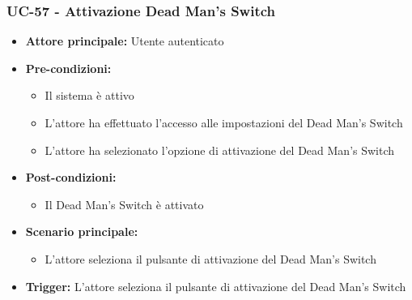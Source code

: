 \documentclass[a4paper,12pt]{article}
\begin{document}
\subsubsection{UC-57 - Attivazione Dead Man's Switch} \label{sec:UC-57}
\begin{itemize}
    \item \textbf{Attore principale:} Utente autenticato
    \item \textbf{Pre-condizioni:}
    \begin{itemize}
        \item Il sistema è attivo
        \item L'attore ha effettuato l'accesso alle impostazioni del Dead Man's Switch
        \item L'attore ha selezionato l'opzione di attivazione del Dead Man's Switch
    \end{itemize}
    \item \textbf{Post-condizioni:}
    \begin{itemize}
        \item Il Dead Man's Switch è attivato
    \end{itemize}
    \item \textbf{Scenario principale:} 
    \begin{itemize}
        \item L'attore seleziona il pulsante di attivazione del Dead Man's Switch
    \end{itemize}
    \item \textbf{Trigger:} L'attore seleziona il pulsante di attivazione del Dead Man's Switch
\end{itemize}
\end{document}
